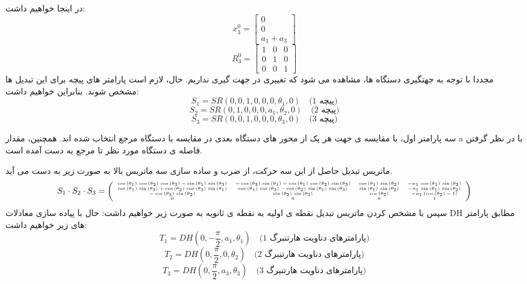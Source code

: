 در اینجا خواهیم داشت:
\[
x_3^0 = \begin{bmatrix}
	0 \\
	0 \\
	a_1 + a_3
\end{bmatrix}
\]
\[
R_3^0 = \begin{bmatrix}
	1 & 0 & 0 \\
	0 & 1 & 0 \\
	0 & 0 & 1
\end{bmatrix}
\]
 مجددا با توجه به جهتگیری دستگاه ها، مشاهده می شود که تغییری در جهت گیری نداریم. 
 حال، لازم است پارامتر های پیچه برای این تبدیل ها مشخص شوند.
 بنابراین خواهیم داشت:
\[
S_1 = SR(0, 0, 1, 0, 0, 0, \theta_1, 0) \quad \text{(پیچه 1)}
\]
\[
S_2 = SR(0, 1, 0, 0, 0, a_1, \theta_2, 0) \quad \text{(پیچه 2)}
\]
\[
S_3 = SR(0, 0, 1, 0, 0, 0, \theta_3, 0) \quad \text{(پیچه 3)}
\]

سه پارامتر اول، با مقایسه ی جهت هر یک از محور های دستگاه بعدی در مقایسه با دستگاه مرجع انتخاب شده اند.  همچنین، مقدار a با در نظر گرفتن فاصله ی دستگاه مورد نظر تا مرجع به دست آمده است.

ماتریس تبدیل حاصل از این سه حرکت، از ضرب و ساده سازی سه ماتریس بالا به صورت زیر به دست می آید.
\[
\tiny
S_1 \cdot S_2 \cdot S_3 =
\left(\begin{array}{cccc}
	\cos \left(\theta_1 \right)\,\cos \left(\theta_2 \right)\,\cos \left(\theta_3 \right)-\sin \left(\theta_1 \right)\,\sin \left(\theta_3 \right) & -\cos \left(\theta_3 \right)\,\sin \left(\theta_1 \right)-\cos \left(\theta_1 \right)\,\cos \left(\theta_2 \right)\,\sin \left(\theta_3 \right) & \cos \left(\theta_1 \right)\,\sin \left(\theta_2 \right) & -a_1 \,\cos \left(\theta_1 \right)\,\sin \left(\theta_2 \right) \\
	\cos \left(\theta_1 \right)\,\sin \left(\theta_3 \right)+\cos \left(\theta_2 \right)\,\cos \left(\theta_3 \right)\,\sin \left(\theta_1 \right) & \cos \left(\theta_1 \right)\,\cos \left(\theta_3 \right)-\cos \left(\theta_2 \right)\,\sin \left(\theta_1 \right)\,\sin \left(\theta_3 \right) & \sin \left(\theta_1 \right)\,\sin \left(\theta_2 \right) & -a_1 \,\sin \left(\theta_1 \right)\,\sin \left(\theta_2 \right) \\
	-\cos \left(\theta_3 \right)\,\sin \left(\theta_2 \right) & \sin \left(\theta_2 \right)\,\sin \left(\theta_3 \right) & \cos \left(\theta_2 \right) & -a_1 \,{\left(\cos \left(\theta_2 \right)-1\right)} \\
	0 & 0 & 0 & 1
\end{array}\right)
\]
سپس با مشخص کردن ماتریس تبدیل نقطه ی اولیه به نقطه ی ثانویه به صورت زیر خواهیم داشت:
 حال با پیاده سازی	معادلات DH مطابق پارامتر های زیر خواهیم داشت:
 \[
 T_1 = DH(0, -\frac{\pi}{2}, a_1, \theta_1) \quad \text{(پارامترهای دناویت هارتنبرگ 1)}
 \]
 \[
 T_2 = DH(0, \frac{\pi}{2}, 0, \theta_2) \quad \text{(پارامترهای دناویت هارتنبرگ 2)}
 \]
 \[
 T_3 = DH(0, \frac{\pi}{2}, a_3, \theta_3) \quad \text{(پارامترهای دناویت هارتنبرگ 3)}
 \]
 
